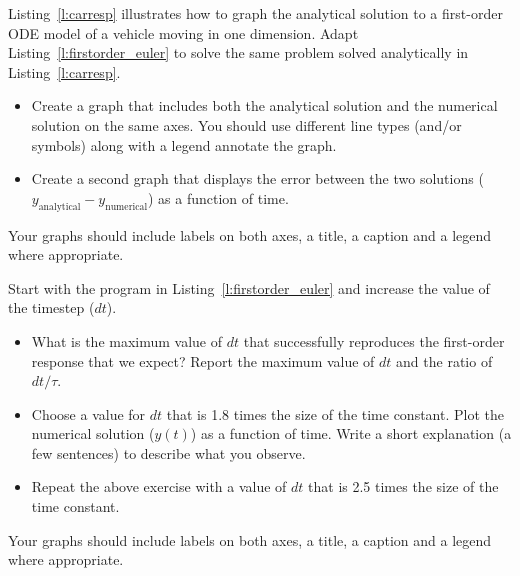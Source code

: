 \begin{ex}
Listing~\ref{l:carresp} illustrates how to graph the analytical solution to a first-order ODE model of a vehicle moving in one dimension.  Adapt Listing~\ref{l:firstorder_euler} to solve the same problem solved analytically in Listing~\ref{l:carresp}. 
\begin{itemize}
\item Create a graph that includes both the analytical solution and the numerical solution on the same axes.  You should use different line types (and/or symbols) along with a legend annotate the graph.
\item Create a second graph that displays the error between the two solutions ($y_{\mathrm{analytical}} - y_{\mathrm{numerical}}$) as a function of time.
\end{itemize}
Your graphs should include labels on both axes, a title, a caption and a legend where appropriate.
\end{ex}

\begin{ex}
Start with the program in Listing~\ref{l:firstorder_euler} and increase the value of the timestep ($dt$).  
\begin{itemize}
\item What is the maximum value of $dt$ that successfully reproduces the first-order response that we expect?  Report the maximum value of $dt$ and the ratio of $dt/\tau$.  
\item Choose a value for $dt$ that is 1.8 times the size of the time constant.  Plot the numerical solution ($y(t)$) as a function of time.  Write a short explanation (a few sentences) to describe what you observe.
\item Repeat the above exercise with a value of $dt$ that is 2.5 times the size of the time constant.
\end{itemize}
Your graphs should include labels on both axes, a title, a caption and a legend where appropriate.
\end{ex}

\ifsolutions


